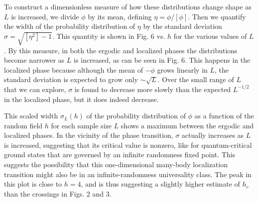 \documentclass[letterpaper, twocolumn,superscriptaddress, showpacs,preprintnumbers,amsmath,amssymb]{revtex4}
\begin{document}
To construct a dimensionless measure of how these distributions
change shape as $L$ is increased, we divide $\phi$ by its mean, defining $\eta=\phi/[\phi]$.
Then we quantify the width of the probability distribution of $\eta$ by the standard deviation
$\sigma=\sqrt{[\eta^2]-1}$.  %
This quantity is shown in Fig. 6 vs. $h$ for the various
values of $L$.  By this measure, in both the ergodic and localized phases the distributions
become narrower as $L$ is increased, as can be seen in Fig. 6.
This happens in the localized phase because although the mean of $-\phi$ grows linearly in $L$, the standard deviation is expected to
grow only $\sim\sqrt{L}$.  Over the small range of $L$ that we can explore, $\sigma$ is found to decrease more
slowly than the expected $L^{-1/2}$ in the localized phase, but it does indeed decrease.

This scaled width $\sigma_L(h)$ of the probability distribution of $\phi$ as a function of the
random field $h$ for each sample size $L$ shows a maximum between the ergodic and localized
phases.  %
In the vicinity of the phase transition, $\sigma$ actually increases as $L$ is increased,
suggesting that its critical value is nonzero, like for quantum-critical ground states that are governed
by an infinite randomness fixed point.  This suggests the possibility that this one-dimensional many-body localization
transition might also be in an infinite-randomness universality class.
The peak in this plot is close to $h=4$, and is thus suggesting a slightly higher estimate
of $h_c$ than the crossings in Figs. 2 and 3.
\end{document}
